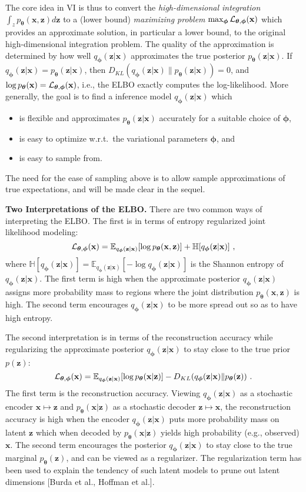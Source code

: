\documentclass{article}
\newcommand{\x}{\mathbf{x}}
\newcommand{\z}{\mathbf{z}}
\newcommand{\cL}{{\cal L}}
\newcommand{\ttheta}{\boldsymbol{\theta}}
\newcommand{\pphi}{\boldsymbol{\phi}}
\newcommand\E{\mathbb{E}}
\begin{document}
The core idea in VI is thus to convert the {\em high-dimensional integration} $\int_z p_{\ttheta}(\x,\z) d\z$ to a (lower bound) {\em maximizing problem} $\max_{\pphi} \cL_{\ttheta,\pphi}(\x)$ which provides an approximate solution, in particular a lower bound, to the original high-dimensional integration problem. The quality of the approximation is determined by how well $q_{\pphi}(\z|\x)$ approximates the true posterior $p_{\ttheta}(\z|\x)$. If $q_{\pphi}(\z|\x) = p_{\ttheta}(\z|\x)$, then $D_{KL}(q_{\pphi}(\z|\x) \| p_{\ttheta}(\z|\x)) = 0$, and $\log p_{\ttheta}(\x) = \cL_{\ttheta,\pphi}(\x)$, i.e., the ELBO exactly computes the log-likelihood. More generally, the goal is to find a inference model $q_{\pphi}(\z|\x)$ which 
\begin{itemize}
	\item is flexible and approximates $p_{\ttheta}(\z|\x)$ accurately for a suitable choice of $\pphi$,
	\item is easy to optimize w.r.t.~the variational parameters $\pphi$, and
	\item is easy to sample from.
\end{itemize} 
The need for the ease of sampling above is to allow sample approximations of true expectations, and will be made clear in the sequel.


{\bf Two Interpretations of the ELBO.} There are two common ways of interpreting the ELBO. The first is in terms of entropy regularized joint likelihood modeling:
\begin{equation}
	\cL_{\ttheta,\pphi}(\x) = \E_{q_{\pphi}(\z|\x)} [ \log p_{\ttheta}(\x,\z) ] + \mathbb{H}[q_{\pphi}(\z|\x)]~, 
\end{equation}
where $\mathbb{H}[q_{\pphi}(\z|\x)] =  \E_{q_{\pphi}(\z|\x)}[- \log q_{\pphi}(\z|\x)]$ is the Shannon entropy of $q_{\pphi}(\z|\x)$. 
The first term is high when the approximate posterior $q_{\pphi}(\z|\x)$ assigns more probability mass to regions where the joint distribution $p_{\ttheta}(\x,\z)$ is high. The second term encourages $q_{\pphi}(\z|\x)$ to be more spread out so as to have high entropy. 

The second interpretation is in terms of the reconstruction accuracy while regularizing the approximate posterior $q_{\pphi}(\z|\x)$ to stay close to the true prior $p(\z)$:
\begin{equation}
	\cL_{\ttheta,\pphi}(\x) = \E_{q_{\pphi}(\z|\x)}[ \log p_{\ttheta}(\x|\z) ] - D_{KL}(q_{\pphi}(\z|\x) \| p_{\ttheta}(\z) )~.  
\end{equation}
The first term is the reconstruction accuracy. Viewing $q_{\pphi}(\z|\x)$ as a stochastic encoder $\x \mapsto \z$ and $p_{\ttheta}(\x|\z)$ as a stochastic decoder $\z \mapsto \x$, the reconstruction accuracy is high when the encoder $q_{\pphi}(\z|\x)$ puts more probability mass on latent $\z$ which when decoded by $p_{\ttheta}(\x|\z)$ yields high probability (e.g., observed) $\x$. The second term encourages the posterior $q_{\pphi}(\z|\x)$ to stay close to the true marginal $p_{\ttheta}(\z)$, and can be viewed as a regularizer. The regularization term has been used to explain the tendency of such latent models to prune out latent dimensions [Burda et al., Hoffman et al.].
\end{document}
